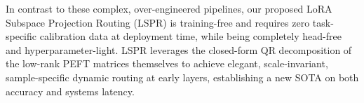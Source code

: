 In contrast to these complex, over-engineered pipelines, our proposed LoRA Subspace Projection Routing (LSPR) is training-free and requires zero task-specific calibration data at deployment time, while being completely head-free and hyperparameter-light. LSPR leverages the closed-form QR decomposition of the low-rank PEFT matrices themselves to achieve elegant, scale-invariant, sample-specific dynamic routing at early layers, establishing a new SOTA on both accuracy and systems latency.
